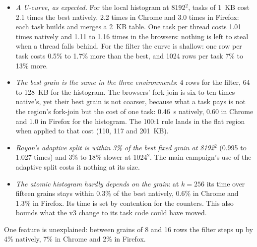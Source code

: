 \begin{itemize}[leftmargin=1.5em]
\item \emph{A U-curve, as expected.} For the local histogram at 8192$^2$,
tasks of 1~KB cost 2.1 times the best natively, 2.2 times in Chrome and 3.0
times in Firefox: each task builds and merges a 2~KB table. One task per
thread costs 1.01 times natively and 1.11 to 1.16 times in the browsers:
nothing is left to steal when a thread falls behind. For the filter the
curve is shallow: one row per task costs 0.5\% to 1.7\% more than the best,
and 1024 rows per task 7\% to 13\% more.
\item \emph{The best grain is the same in the three environments}: 4 rows
for the filter, 64 to 128~KB for the histogram. The browsers' fork-join is
six to ten times native's, yet their best grain is not coarser, because
what a task pays is not the region's fork-join but the cost of one task:
0.46~\textmu s natively, 0.60 in Chrome and 1.0 in Firefox for the
histogram. The 100:1 rule lands in the flat region when applied to that
cost (110, 117 and 201~KB).
\item \emph{Rayon's adaptive split is within 3\% of the best fixed grain at
8192$^2$} (0.995 to 1.027 times) and 3\% to 18\% slower at 1024$^2$. The
main campaign's use of the adaptive split costs it nothing at its size.
\item \emph{The atomic histogram hardly depends on the grain}: at $k=256$
its time over fifteen grains stays within 0.3\% of the best natively, 0.6\%
in Chrome and 1.3\% in Firefox. Its time is set by contention for the
counters. This also bounds what the v3 change to its task code could have
moved.
\end{itemize}
One feature is unexplained: between grains of 8 and 16 rows the filter
steps up by 4\% natively, 7\% in Chrome and 2\% in Firefox.
